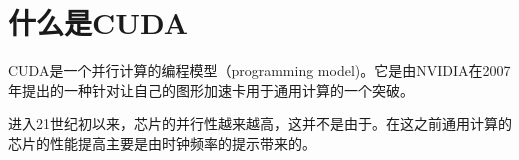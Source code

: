 

\chapter{什么是CUDA}

CUDA是一个并行计算的编程模型（programming model)。它是由NVIDIA在2007年提出的一种针对让自己的图形加速卡用于通用计算的一个突破。

进入21世纪初以来，芯片的并行性越来越高，这并不是由于。在这之前通用计算的芯片的性能提高主要是由时钟频率的提示带来的。